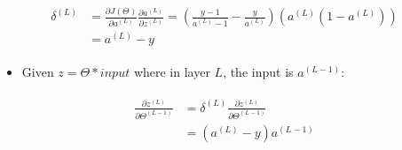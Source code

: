 \documentclass[a4paper,12pt]{report}
\begin{document}
\begin{appendices}
\begin{itemize}
\end{itemize}
\begin{align}
\begin{split}
\delta^{(L)} &= \frac{\partial J(\Theta)}{\partial a^{(L)}}\frac{\partial a^{(L)}}{\partial z^{(L)}} = \left( \frac{y-1}{a^{(L)}-1} - \frac{y}{a^{(L)}}\right) ( a^{(L)}(1-a^{(L)})) \\
&= a^{(L)} - y
\end{split}
\end{align}
\begin{itemize}
\item Given $z=\Theta * input $  where in layer $L$, the input is $a^{(L-1)}$:
\end{itemize}
\begin{align}
\begin{split}
\frac{\partial z^{(L)}}{\partial \Theta^{(L-1)}} &= \delta^{(L)}\frac{\partial z^{(L)}}{\partial \Theta^{(L-1)}}\\
&= (a^{(L)}-y)a^{(L-1)}
\end{split}
\end{align}


\end{appendices}
\end{document}
